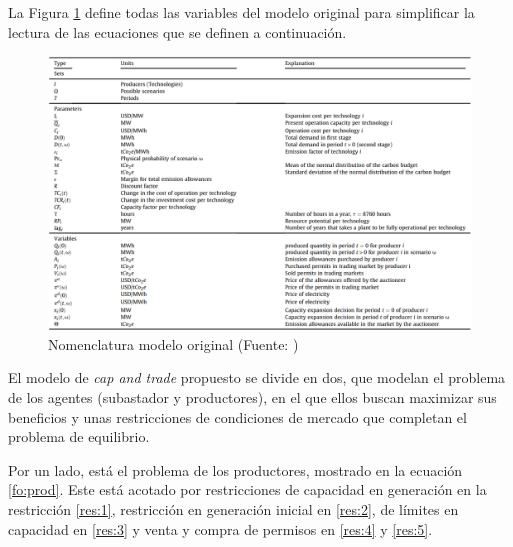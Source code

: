 La Figura \ref{fig:nomenclatura1} define todas las variables del modelo original para simplificar la lectura de las ecuaciones que se definen a continuación.
\vspace{2.5mm}

\begin{figure}[H]
    \centering
    \includegraphics[width=15cm]{docs/DocumentoMemoria/core/images/Tabla amigo.png}
    \caption{Nomenclatura modelo original (Fuente: \protect{})}
    \label{fig:nomenclatura1}
\end{figure}

El modelo de \textit{cap and trade} propuesto se divide en dos,  que modelan el problema de los agentes (subastador y productores), en el que ellos buscan maximizar sus beneficios y unas restricciones de condiciones de mercado que completan el problema de equilibrio.
\vspace{2.5mm}

Por un lado, está el problema de los productores, mostrado en la ecuación \ref{fo:prod}. Este está acotado por restricciones de capacidad en generación en la restricción \ref{res:1}, restricción en generación inicial en \ref{res:2}, de límites en capacidad en \ref{res:3} y venta y compra de permisos en \ref{res:4} y \ref{res:5}. 

